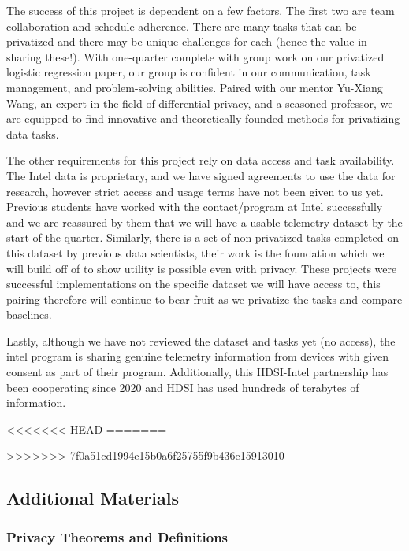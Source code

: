 \documentclass[12pt,letterpaper]{article}
\begin{document}
The success of this project is dependent on a few factors. The first two are team collaboration and schedule adherence. There are many tasks that can be privatized and there may be unique challenges for each (hence the value in sharing these!). With one-quarter complete with group work on our privatized logistic regression paper, our group is confident in our communication, task management, and problem-solving abilities. Paired with our mentor Yu-Xiang Wang, an expert in the field of differential privacy, and a seasoned professor, we are equipped to find innovative and theoretically founded methods for privatizing data tasks.

The other requirements for this project rely on data access and task availability. The Intel data is proprietary, and we have signed agreements to use the data for research, however strict access and usage terms have not been given to us yet. Previous students have worked with the contact/program at Intel successfully and we are reassured by them that we will have a usable telemetry dataset by the start of the quarter.  Similarly, there is a set of non-privatized tasks completed on this dataset by previous data scientists, their work is the foundation which we will build off of to show utility is possible even with privacy. These projects were successful implementations on the specific dataset we will have access to, this pairing therefore will continue to bear fruit as we privatize the tasks and compare baselines. 

Lastly, although we have not reviewed the dataset and tasks yet (no access), the intel program is sharing genuine telemetry information from devices with given consent as part of their program. Additionally, this HDSI-Intel partnership has been cooperating since 2020 and HDSI has used hundreds of terabytes of information.

<<<<<<< HEAD
=======

>>>>>>> 7f0a51cd1994e15b0a6f25755f9b436e15913010
\subsection{Additional Materials}

\subsubsection{Privacy Theorems and Definitions}
\end{document}
